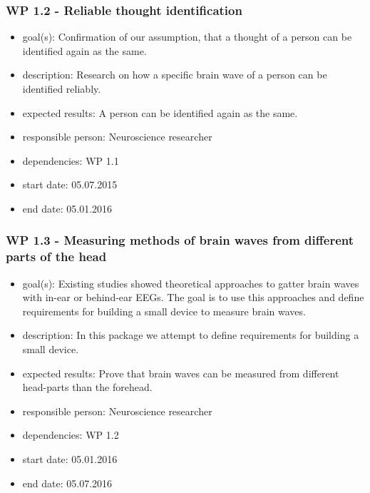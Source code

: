 \subsubsection*{WP 1.2 - Reliable thought identification}
\begin{itemize}
 \item goal(s): Confirmation of our assumption, that a thought of a person can be identified again as the same.
 \item description: Research on how a specific brain wave of a person can be identified reliably.
 \item expected results: A person can be identified again as the same.
 \item responsible person: Neuroscience researcher
 \item dependencies: WP 1.1
 \item start date: 05.07.2015
 \item end date: 05.01.2016
\end{itemize}

\subsubsection*{WP 1.3 - Measuring methods of brain waves from different parts of the head}
\begin{itemize}
 \item goal(s): Existing studies showed theoretical approaches to gatter brain waves with in-ear or behind-ear EEGs. The goal is to use this approaches and define requirements for building a small device to measure brain waves.
 \item description: In this package we attempt to define requirements for building a small device.
 \item expected results: Prove that brain waves can be measured from different head-parts than the forehead.
 \item responsible person: Neuroscience researcher
 \item dependencies: WP 1.2
 \item start date: 05.01.2016
 \item end date: 05.07.2016
\end{itemize}

